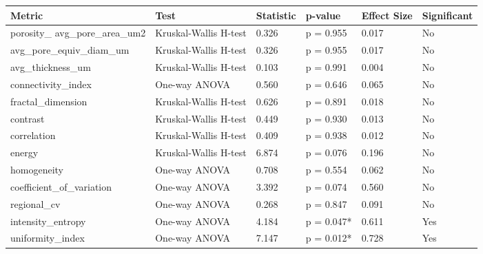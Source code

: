 \begin{tabular}{llllll}
\toprule
Metric & Test & Statistic & p-value & Effect Size & Significant \\
\midrule
porosity_%
avg_pore_area_um2 & Kruskal-Wallis H-test & 0.326 & p = 0.955 & 0.017 & No \\
avg_pore_equiv_diam_um & Kruskal-Wallis H-test & 0.326 & p = 0.955 & 0.017 & No \\
avg_thickness_um & Kruskal-Wallis H-test & 0.103 & p = 0.991 & 0.004 & No \\
connectivity_index & One-way ANOVA & 0.560 & p = 0.646 & 0.065 & No \\
fractal_dimension & Kruskal-Wallis H-test & 0.626 & p = 0.891 & 0.018 & No \\
contrast & Kruskal-Wallis H-test & 0.449 & p = 0.930 & 0.013 & No \\
correlation & Kruskal-Wallis H-test & 0.409 & p = 0.938 & 0.012 & No \\
energy & Kruskal-Wallis H-test & 6.874 & p = 0.076 & 0.196 & No \\
homogeneity & One-way ANOVA & 0.708 & p = 0.554 & 0.062 & No \\
coefficient_of_variation & One-way ANOVA & 3.392 & p = 0.074 & 0.560 & No \\
regional_cv & One-way ANOVA & 0.268 & p = 0.847 & 0.091 & No \\
intensity_entropy & One-way ANOVA & 4.184 & p = 0.047* & 0.611 & Yes \\
uniformity_index & One-way ANOVA & 7.147 & p = 0.012* & 0.728 & Yes \\
\bottomrule
\end{tabular}
